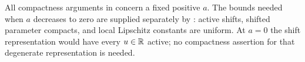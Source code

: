All compactness arguments in  concern a fixed
positive $a$.  The bounds needed when $a$ decreases to zero are supplied
separately by : active shifts, shifted
parameter compacts, and local Lipschitz constants are uniform.  At
$a=0$ the shift representation would have every $u\in\mathbb R$ active; no
compactness assertion for that degenerate representation is needed.
